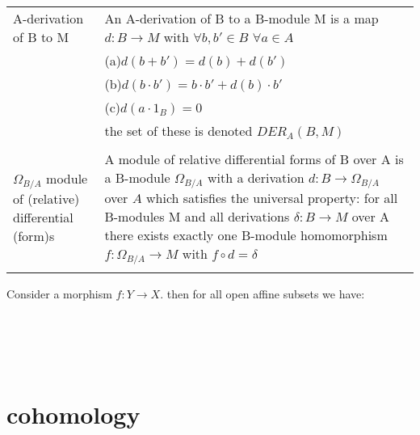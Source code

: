 \documentclass[a4paper, 12pt]{article}
\begin{document}
\begin{tabular}{p{4cm} p{11cm}}


	A-derivation of B to M & An A-derivation of B to a B-module M is a map $d:B\longrightarrow M$ with $\forall b,b'\in B$ $\forall a  \in A$\\
	&(a)$d(b+b')=d(b)+d(b')$\\
	&(b)$d(b\cdot b')= b\cdot b' + d(b)\cdot b'$\\
	&(c)$d(a\cdot 1_B)= 0$\\
	& the set of these is denoted $DER_A(B,M)$\\
	
	&\\

$\Omega_{B/A}$ module of (relative) differential (form)s & A module of relative differential forms of B over A is a B-module $\Omega_{B/A}$ with a derivation $d:B \longrightarrow \Omega_{B/A}$ over $A$ which satisfies the universal property: for all B-modules M and all derivations $\delta : B \longrightarrow M$ over A there exists exactly one B-module homomorphism $f: \Omega_{B/A} \longrightarrow M $ with $f \circ d = \delta $ \\

&\\
  \end{tabular}


Consider a morphism $f:Y \longrightarrow X$. then for all open affine subsets we have:


\begin{longtable}{p{}  p{} } 




\end{longtable}



\begin{tabular}{p{4cm} p{11cm}}


  \end{tabular}

\begin{tabular}{p{4cm} p{11cm}}


  \end{tabular}

\begin{tabular}{p{4cm} p{11cm}}


  \end{tabular}

\begin{tabular}{p{4cm} p{11cm}}


  \end{tabular}


\section{cohomology}
\end{document}
